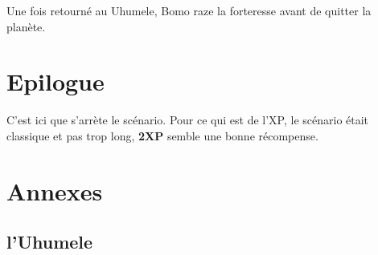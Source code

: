 \documentclass{jdrp}
\begin{document}
	Une fois retourné au Uhumele, Bomo raze la forteresse avant de quitter la planète.

	\section{Epilogue}
	C’est ici que s’arrète le scénario. Pour ce qui est de l’XP, le scénario était classique et pas trop long, \textbf{2XP} semble une bonne récompense.


	\newpage
	\section{Annexes}
	\subsection{l’Uhumele}\label{sec:uhumele}

	

	\onecolumn
	\nocite{*}
	\printbibliography
\end{document}
